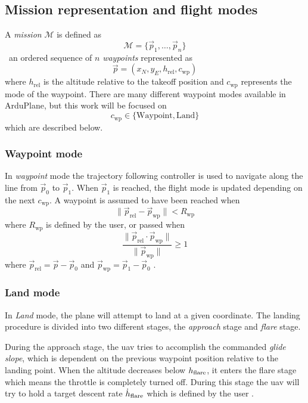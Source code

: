 \subsection{Mission representation and flight modes}\label{sec:mission}
A \textit{mission} $\mathcal{M}$ is defined as 
\begin{equation}
    \mathcal{M} = \{\vec{p}_1, \hdots, \vec{p}_n\}
\end{equation}
\ie\  an ordered sequence of $n$ \textit{waypoints} represented as 
\begin{equation}
    \vec{p}=(x_N, y_E, h_{\text{rel}}, c_{\text{wp}})
\end{equation}
where $h_{\text{rel}}$ is the altitude relative to the takeoff position and $c_{\text{wp}}$ represents the mode of the waypoint. There are many different waypoint modes available
in ArduPlane, but this work will be focused on
\begin{equation}
    c_{\text{wp}}\in \{\text{Waypoint}, \text{Land}\}
\end{equation}
which are described below.
\subsubsection{Waypoint mode}
In \textit{waypoint} mode the trajectory following controller is used
to navigate along the line from $\vec{p}_0$ to $\vec{p}_1$. When $\vec{p}_1$ is reached, the flight mode
is updated depending on the next $c_{\text{wp}}$. A waypoint is assumed to have been reached when
\begin{equation}
    \|\vec{p}_{\text{rel}}-\vec{p}_{\text{wp}}\| < R_{\text{wp}}
\end{equation}
where $R_{\text{wp}}$ is defined by the user, or passed when
\begin{equation}
    \frac{\|\vec{p}_{\text{rel}}\cdot \vec{p}_{\text{wp}}\|}{\|\vec{p}_{\text{wp}}\|}
     \geq 1
\end{equation}
where $\vec{p}_{\text{rel}}=\vec{p}-\vec{p}_0$ and $\vec{p}_{\text{wp}}=\vec{p}_1-\vec{p}_0$ \cite{ardupilot_auto}.
\subsubsection{Land mode}
In \textit{Land} mode, the plane will attempt to land at a given coordinate. The landing procedure 
is divided into two different stages, the \textit{approach} stage and \textit{flare} stage.

During the approach stage, the \ac{uav} tries to accomplish the commanded \textit{glide slope}, which is
dependent on the previous waypoint position relative to the landing point. When the altitude decreases
below $h_{\text{flare}}$, it enters the flare stage which means the throttle is completely turned off. 
During this stage the \ac{uav} will try to hold a target descent rate $\dot{h}_{\text{flare}}$ which is
defined by the user \cite{ardupilot_land}.